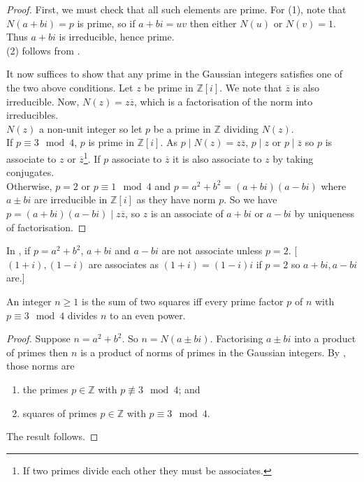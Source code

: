 \begin{proof}
	First, we must check that all such elements are prime.
	For (1), note that $N(a+bi) = p$ is prime, so if $a+bi = uv$ then either $N(u)$ or $N(v) = 1$. 
	Thus $a + bi$ is irreducible, hence prime. \\
	(2) follows from .

	It now suffices to show that any prime in the Gaussian integers satisfies one of the two above conditions.
	Let $z$ be prime in $\mathbb Z[i]$.
	We note that $\overline z$ is also irreducible.
	Now, $N(z) = z\overline z$, which is a factorisation of the norm into irreducibles. \\
	$N(z)$ a non-unit integer so let $p$ be a prime in $\mathbb Z$ dividing $N(z)$. \\
	If $p \equiv 3 \mod 4$, $p$ is prime in $\mathbb Z[i]$.
	As $p \mid N(z) = z \overline z$, $p \mid z$ or $p \mid \overline z$ so $p$ is associate to $z$ or $\overline z$\footnote{If two primes divide each other they must be associates.}. 
	If $p$ associate to $\overline z$ it is also associate to $z$ by taking conjugates. \\
	Otherwise, $p = 2$ or $p \equiv 1 \mod 4$ and $p = a^2 + b^2 = (a+bi)(a-bi)$ where $a \pm bi$ are irreducible in $\mathbb Z[i]$ as they have norm $p$.
	So we have $p = (a+bi)(a-bi) \mid z \overline z$, so $z$ is an associate of $a+bi$ or $a-bi$ by uniqueness of factorisation.
\end{proof}

\begin{remark}
	In , if $p = a^2 + b^2$, $a+bi$ and $a-bi$ are not associate unless $p = 2$.
	[$(1+i), (1-i)$ are associates as $(1+i) = (1 - i)i$ if $p = 2$ so $a+bi, a-bi$ are.]
\end{remark}

\begin{corollary} \label{cor:12.1}
	An integer $n \geq 1$ is the sum of two squares iff every prime factor $p$ of $n$ with $p \equiv 3 \mod 4$ divides $n$ to an even power.
\end{corollary}

\begin{proof}
	Suppose $n = a^2 + b^2$.
	So $n = N(a \pm bi)$.
	Factorising $a \pm bi$ into a product of primes then $n$ is a product of norms of primes in the Gaussian integers.
	By , those norms are
	\begin{enumerate}
		\item the primes $p \in \mathbb Z$ with $p \not\equiv 3 \mod 4$; and
		\item squares of primes $p \in \mathbb Z$ with $p \equiv 3 \mod 4$.
	\end{enumerate}
	The result follows.
\end{proof}

